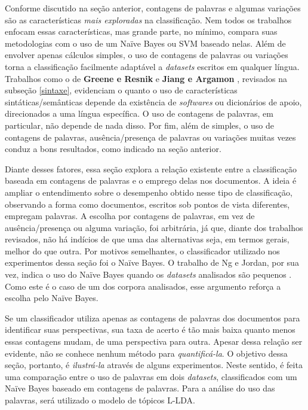 Conforme discutido na seção anterior, contagens de palavras e algumas variações são as características \emph{mais exploradas} na classificação. Nem todos os trabalhos enfocam essas características, mas grande parte, no mínimo, compara suas metodologias com o uso de um Naïve Bayes ou SVM baseado nelas. Além de envolver apenas cálculos simples, o uso de contagens de palavras ou variações torna a classificação facilmente adaptável a \emph{datasets} escritos em qualquer língua. Trabalhos como o de \textbf{Greene e Resnik} e \textbf{Jiang e Argamon} \cite{greene} \cite{jiang-argamon}, revisados na subseção \ref{sintaxe}, evidenciam o quanto o uso de características sintáticas/semânticas depende da existência de \emph{softwares} ou dicionários de apoio, direcionados a uma língua específica. O uso de contagens de palavras, em particular, não depende de nada disso. Por fim, além de simples, o uso de contagens de palavras, ausência/presença de palavras ou variações muitas vezes conduz a bons resultados, como indicado na seção anterior. 

Diante desses fatores, essa seção explora a relação existente entre a classificação baseada em contagens de palavras e o emprego delas nos documentos. A ideia é ampliar o entendimento sobre o desempenho obtido nesse tipo de classificação, observando a forma como documentos, escritos sob pontos de vista diferentes, empregam palavras. A escolha por contagens de palavras, em vez de ausência/presença ou alguma variação, foi arbitrária, já que, diante dos trabalhos revisados, não há indícios de que uma das alternativas seja, em termos gerais, melhor do que outra. Por motivos semelhantes, o classificador utilizado nos experimentos dessa seção foi o Naïve Bayes. O trabalho de Ng e Jordan, por sua vez, indica o uso do Naïve Bayes quando os \emph{datasets} analisados são pequenos \cite{ng-jordan}. Como este é o caso de um dos corpora analisados, esse argumento reforça a escolha pelo Naïve Bayes. %


Se um classificador utiliza apenas as contagens de palavras dos documentos para identificar suas perspectivas, sua taxa de acerto é tão mais baixa quanto menos essas contagens mudam, de uma perspectiva para outra. Apesar dessa relação ser evidente, não se conhece nenhum método para \emph{quantificá-la}.  O objetivo dessa seção, portanto, é \emph{ilustrá-la} através de alguns experimentos. Neste sentido, é feita uma comparação entre o uso de palavras em dois \emph{datasets}, classificados com um Naïve Bayes baseado em contagens de palavras. Para a análise do uso das palavras, será utilizado o modelo de tópicos L-LDA. 

